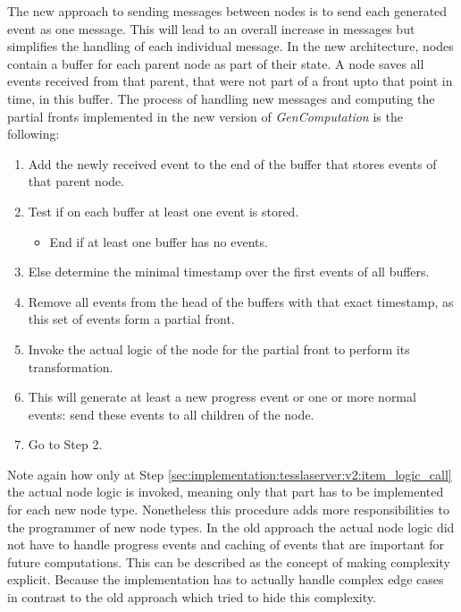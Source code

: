 The new approach to sending messages between nodes is to send each generated event as one message.
This will lead to an overall increase in messages but simplifies the handling of each individual message.
In the new architecture, nodes contain a buffer for each parent node as part of their state.
A node saves all events received from that parent, that were not part of a front upto that point in time, in this buffer.
The process of handling new messages and computing the partial fronts implemented in the new version of \emph{GenComputation} is the following:

\begin{enumerate}
  \item Add the newly received event to the end of the buffer that stores events of that parent node.
  \item Test if on each buffer at least one event is stored.
    \begin{itemize}
      \item End if at least one buffer has no events.
    \end{itemize}
  \item Else determine the minimal timestamp over the first events of all buffers.
  \item Remove all events from the head of the buffers with that exact timestamp, as this set of events form a partial front.
  \item\label{sec:implementation:tesslaserver:v2:item_logic_call} Invoke the actual logic of the node for the partial front to perform its transformation.
  \item This will generate at least a new progress event or one or more normal events: send these events to all children of the node.
  \item Go to Step 2.
\end{enumerate}

Note again how only at Step \ref{sec:implementation:tesslaserver:v2:item_logic_call} the actual node logic is invoked, meaning only that part has to be implemented for each new node type.
Nonetheless this procedure adds more responsibilities to the programmer of new node types.
In the old approach the actual node logic did not have to handle progress events and caching of events that are important for future computations.
This can be described as the concept of making complexity explicit.
Because the implementation has to actually handle complex edge cases in contrast to the old approach which tried to hide this complexity.

